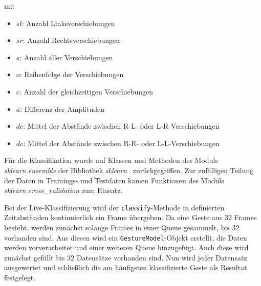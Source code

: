 mit

\begin{itemize}
\item $sl$: Anzahl Linksverschiebungen
\item $sr$: Anzahl Rechtsverschiebungen
\item $s$: Anzahl aller Verschiebungen
\item $o$: Reihenfolge der Verschiebungen
\item $c$: Anzahl der gleichzeitigen Verschiebungen
\item $a$: Differenz der Amplituden
\item $dc$: Mittel der Abstände zwischen R-L- oder L-R-Verschiebungen
\item $de$: Mittel der Abstände zwischen R-R- oder L-L-Verschiebungen
\end{itemize}

Für die Klassifikation wurde auf Klassen und Methoden des Moduls \textit{sklearn.ensemble} der Bibliothek \textit{sklearn}~\cite{sklearn} zurückgegriffen. Zur zufälligen Teilung der Daten in Trainings- und Testdaten kamen Funktionen des Moduls \textit{sklearn.cross\_validation} zum Einsatz.

Bei der Live-Klassifizierung wird der \texttt{classify}-Methode in definierten Zeitabständen kontinuierlich ein Frame übergeben. Da eine Geste aus 32 Frames besteht, werden zunächst solange Frames in einer Queue gesammelt, bis 32 vorhanden sind. Aus diesen wird ein \texttt{GestureModel}-Objekt erstellt, die Daten werden vorverarbeitet und einer weiteren Queue hinzugefügt. Auch diese wird zunächst gefüllt bis 32 Datensätze vorhanden sind. Nun wird jeder Datensatz ausgewertet und schließlich die am häufigsten klassifizierte Geste als Resultat festgelegt.


